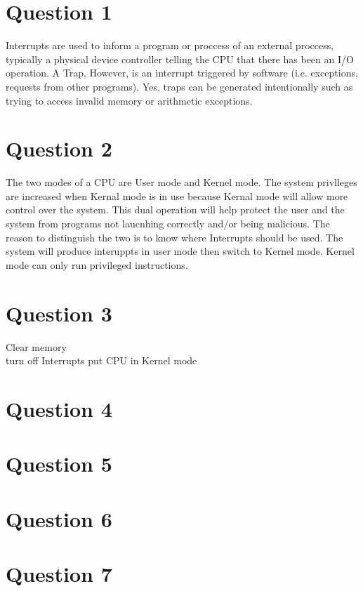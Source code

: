 \documentclass[11pt]{book}
\begin{document}
\maketitle


\section*{Question 1}
Interrupts are used to inform a program or proccess
of an external proccess, typically a physical 
device controller telling the CPU that there has 
been an I/O operation. A Trap, However, is an interrupt 
triggered by software (i.e. exceptions, requests
from other programs). Yes, traps can be generated 
intentionally such as trying to access invalid memory
or arithmetic exceptions.
\section*{Question 2}
The two modes of a CPU are User mode and Kernel mode.
The system privlleges are increased when Kernal mode
is in use because Kernal mode will allow more control
over the system. This dual operation will help protect
the user and the system from programs not laucnhing 
correctly and/or being malicious. The reason to 
distinguish the two is to know where Interrupts
should be used. The system will produce interuppts 
in user mode then switch to Kernel mode. Kernel mode 
can only run privileged instructions.
\section*{Question 3}
Clear memory\\
turn off Interrupts
put CPU in Kernel mode
\section*{Question 4}

\section*{Question 5}

\section*{Question 6}

\section*{Question 7}
\end{document}
